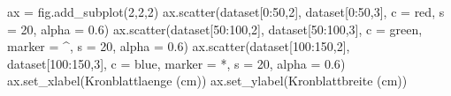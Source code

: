 \documentclass[
  a4paper,
  DIV=11]{scrreprt}
\newenvironment{Shaded}{\begin{snugshade}}{\end{snugshade}}
\newcommand{\DecValTok}[1]{\textcolor[rgb]{0.68,0.00,0.00}{#1}}
\newcommand{\FloatTok}[1]{\textcolor[rgb]{0.68,0.00,0.00}{#1}}
\newcommand{\NormalTok}[1]{\textcolor[rgb]{0.00,0.23,0.31}{#1}}
\newcommand{\OperatorTok}[1]{\textcolor[rgb]{0.37,0.37,0.37}{#1}}
\newcommand{\StringTok}[1]{\textcolor[rgb]{0.13,0.47,0.30}{#1}}
\theoremstyle{definition}
\theoremstyle{definition}
\theoremstyle{remark}
\begin{document}
\begin{Shaded}
\begin{Highlighting}[]
\NormalTok{ax }\OperatorTok{=}\NormalTok{ fig.add\_subplot(}\DecValTok{2}\NormalTok{,}\DecValTok{2}\NormalTok{,}\DecValTok{2}\NormalTok{)}
\NormalTok{ax.scatter(dataset[}\DecValTok{0}\NormalTok{:}\DecValTok{50}\NormalTok{,}\DecValTok{2}\NormalTok{], dataset[}\DecValTok{0}\NormalTok{:}\DecValTok{50}\NormalTok{,}\DecValTok{3}\NormalTok{], }
\NormalTok{            c }\OperatorTok{=} \StringTok{\textquotesingle{}red\textquotesingle{}}\NormalTok{, s }\OperatorTok{=} \DecValTok{20}\NormalTok{, alpha }\OperatorTok{=} \FloatTok{0.6}\NormalTok{)}
\NormalTok{ax.scatter(dataset[}\DecValTok{50}\NormalTok{:}\DecValTok{100}\NormalTok{,}\DecValTok{2}\NormalTok{], dataset[}\DecValTok{50}\NormalTok{:}\DecValTok{100}\NormalTok{,}\DecValTok{3}\NormalTok{], }
\NormalTok{            c }\OperatorTok{=} \StringTok{\textquotesingle{}green\textquotesingle{}}\NormalTok{, marker }\OperatorTok{=} \StringTok{\textquotesingle{}\^{}\textquotesingle{}}\NormalTok{, s }\OperatorTok{=} \DecValTok{20}\NormalTok{, alpha }\OperatorTok{=} \FloatTok{0.6}\NormalTok{)}
\NormalTok{ax.scatter(dataset[}\DecValTok{100}\NormalTok{:}\DecValTok{150}\NormalTok{,}\DecValTok{2}\NormalTok{], dataset[}\DecValTok{100}\NormalTok{:}\DecValTok{150}\NormalTok{,}\DecValTok{3}\NormalTok{], }
\NormalTok{            c }\OperatorTok{=} \StringTok{\textquotesingle{}blue\textquotesingle{}}\NormalTok{, marker }\OperatorTok{=} \StringTok{\textquotesingle{}*\textquotesingle{}}\NormalTok{, s }\OperatorTok{=} \DecValTok{20}\NormalTok{, alpha }\OperatorTok{=} \FloatTok{0.6}\NormalTok{)}
\NormalTok{ax.set\_xlabel(}\StringTok{\textquotesingle{}Kronblattlaenge (cm)\textquotesingle{}}\NormalTok{)}
\NormalTok{ax.set\_ylabel(}\StringTok{\textquotesingle{}Kronblattbreite (cm)\textquotesingle{}}\NormalTok{)}


\end{Highlighting}
\end{Shaded}
\end{document}
